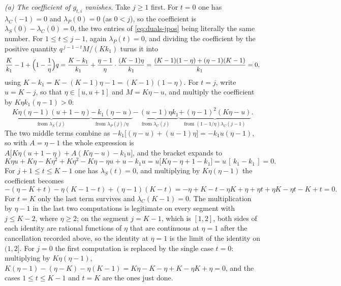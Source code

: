 \emph{(a) The coefficient of $g_{t,i}$ vanishes.}  Take $j\ge1$ first.
For $t=0$ one has $\lambda_C(-1)=0$ and $\lambda_P(0)=0$ (as $0<j$), so the
coefficient is $\lambda_S(0)-\lambda_C(0)=0$, the two entries of
\eqref{eq:duals-jpos} being literally the same number.  For $1\le t\le j-1$,
again $\lambda_P(t)=0$, and dividing the coefficient by the positive quantity
$q^{\,j-1-t}M/(Kk_1)$ turns it into
\[
  \frac{K}{k_1}-1+\Bigl(1-\frac1\eta\Bigr)q
  =\frac{K-k_1}{k_1}+\frac{\eta-1}{\eta}\cdot\frac{(K-1)\eta}{k_1}
  =\frac{(K-1)(1-\eta)+(\eta-1)(K-1)}{k_1}=0,
\]
using $K-k_1=K-(K-1)\eta-1=(K-1)(1-\eta)$.  For $t=j$, write $u=K-j$, so that
$\eta\in[u,u+1]$ and $M=K\eta-u$, and multiply the coefficient by
$K\eta k_1(\eta-1)>0$:
\[
  \underbrace{K\eta(\eta-1)(u+1-\eta)}_{\text{from }\lambda_S(j)}
  \underbrace{-\,k_1(\eta-u)}_{\text{from }\lambda_P(j)/\eta}
  \underbrace{-\,(u-1)\eta k_1}_{\text{from }\lambda_C(j)}
  \underbrace{+\,(\eta-1)^{2}(K\eta-u)}_{\text{from }(1-1/\eta)\lambda_C(j-1)} .
\]
The two middle terms combine as
$-k_1\bigl[(\eta-u)+(u-1)\eta\bigr]=-k_1u(\eta-1)$, so with $A=\eta-1$ the
whole expression is $A\bigl[K\eta(u+1-\eta)+A(K\eta-u)-k_1u\bigr]$, and the
bracket expands to
\[
  K\eta u+K\eta-K\eta^{2}+K\eta^{2}-K\eta-\eta u+u-k_1u
  =u\bigl[K\eta-\eta+1-k_1\bigr]=u\,[\,k_1-k_1\,]=0 .
\]
For $j+1\le t\le K-1$ one has $\lambda_S(t)=0$, and multiplying by
$K\eta(\eta-1)$ the coefficient becomes
\[
  -(\eta-K+t)-\eta(K-1-t)+(\eta-1)(K-t)
  =-\eta+K-t-\eta K+\eta+\eta t+\eta K-\eta t-K+t=0 .
\]
For $t=K$ only the last term survives and $\lambda_C(K-1)=0$.  The
multiplication by $\eta-1$ in the last two computations is legitimate on every
segment with $j\le K-2$, where $\eta\ge2$; on the segment $j=K-1$, which is
$[1,2]$, both sides of each identity are rational functions of $\eta$ that are
continuous at $\eta=1$ after the cancellation recorded above, so the identity
at $\eta=1$ is the limit of the identity on $(1,2]$.  For $j=0$ the
first computation is replaced by the single case $t=0$: multiplying by
$K\eta(\eta-1)$,
$K(\eta-1)-(\eta-K)-\eta(K-1)=K\eta-K-\eta+K-\eta K+\eta=0$, and the cases
$1\le t\le K-1$ and $t=K$ are the ones just done.

